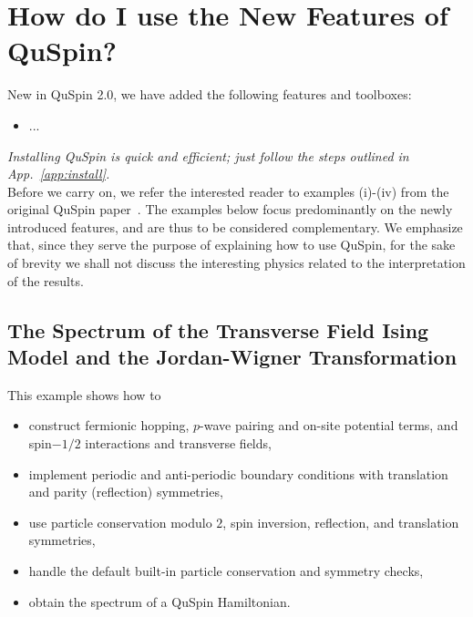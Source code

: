 \documentclass{SciPost}
\newcommand\0{\scalebox{-1}[1]{0}}
\begin{document}
\section{How do I use the New Features of QuSpin?}
\label{sec:examples}

New in QuSpin 2.0, we have added the following features and toolboxes:
\begin{itemize}
	\item ...
\end{itemize}

\emph{Installing QuSpin is quick and efficient; just follow the steps outlined in App.~\ref{app:install}.}\\

\noindent Before we carry on, we refer the interested reader to examples (i)-(iv) from the original QuSpin paper~\cite{weinberg_17_quspin}. The examples below focus predominantly on the newly introduced features, and are thus to be considered complementary. We emphasize that, since they serve the purpose of explaining how to use QuSpin, for the sake of brevity we shall not discuss the interesting physics related to the interpretation of the results.

\subsection{The Spectrum of the Transverse Field Ising Model and the Jordan-Wigner Transformation}
\label{subsec:JW}

This example shows how to
\begin{itemize}
	\item construct fermionic hopping, $p$-wave pairing and on-site potential terms, and spin$-1/2$ interactions and transverse fields,
	\item implement periodic and anti-periodic boundary conditions with translation and parity (reflection) symmetries,
	\item use particle conservation modulo $2$, spin inversion, reflection, and translation symmetries,
	\item handle the default built-in particle conservation and symmetry checks,
	\item obtain the spectrum of a QuSpin Hamiltonian.
\end{itemize}
\end{document}
